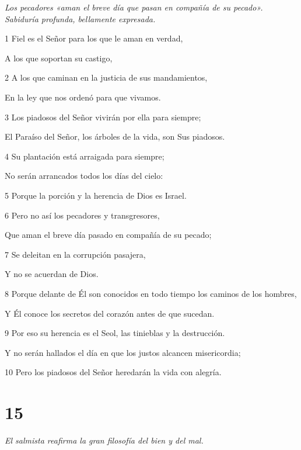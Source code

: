 \par \textit{Los pecadores «aman el breve día que pasan en compañía de su pecado». Sabiduría profunda, bellamente expresada.}

\par 1 Fiel es el Señor para los que le aman en verdad,
\par     A los que soportan su castigo,
\par 2 A los que caminan en la justicia de sus mandamientos,
\par     En la ley que nos ordenó para que vivamos.
\par 3 Los piadosos del Señor vivirán por ella para siempre;
\par     El Paraíso del Señor, los árboles de la vida, son Sus piadosos.
\par 4 Su plantación está arraigada para siempre;
\par     No serán arrancados todos los días del cielo:
\par 5 Porque la porción y la herencia de Dios es Israel.
\par 6 Pero no así los pecadores y transgresores,
\par     Que aman el breve día pasado en compañía de su pecado;
\par 7 Se deleitan en la corrupción pasajera,
\par     Y no se acuerdan de Dios.
\par 8 Porque delante de Él son conocidos en todo tiempo los caminos de los hombres,
\par     Y Él conoce los secretos del corazón antes de que sucedan.
\par 9 Por eso su herencia es el Seol, las tinieblas y la destrucción.
\par     Y no serán hallados el día en que los justos alcancen misericordia;
\par 10 Pero los piadosos del Señor heredarán la vida con alegría.

\chapter{15}

\par \textit{El salmista reafirma la gran filosofía del bien y del mal.}

